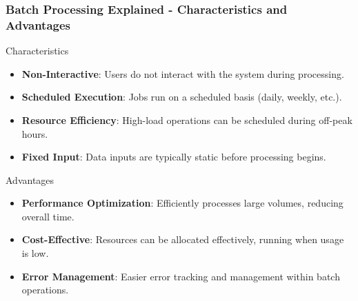 \documentclass[aspectratio=169]{beamer}
\begin{document}
\begin{frame}[fragile]
    \frametitle{Batch Processing Explained - Characteristics and Advantages}
    \begin{block}{Characteristics}
        \begin{itemize}
            \item \textbf{Non-Interactive}: Users do not interact with the system during processing.
            \item \textbf{Scheduled Execution}: Jobs run on a scheduled basis (daily, weekly, etc.).
            \item \textbf{Resource Efficiency}: High-load operations can be scheduled during off-peak hours.
            \item \textbf{Fixed Input}: Data inputs are typically static before processing begins.
        \end{itemize}
    \end{block}

    \begin{block}{Advantages}
        \begin{itemize}
            \item \textbf{Performance Optimization}: Efficiently processes large volumes, reducing overall time.
            \item \textbf{Cost-Effective}: Resources can be allocated effectively, running when usage is low.
            \item \textbf{Error Management}: Easier error tracking and management within batch operations.
        \end{itemize}
    \end{block}
\end{frame}
\end{document}
